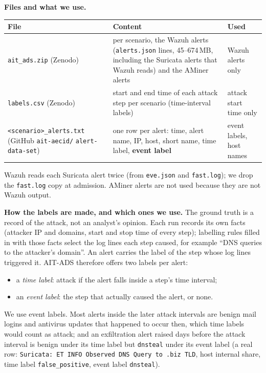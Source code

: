 \documentclass[10.5pt,a4paper]{article}
\newcommand{\sub}[1]{\par\smallskip\noindent\textbf{#1}\quad}
\begin{document}
\sub{Files and what we use.}
\begin{center}\small
\begin{tabularx}{\linewidth}{@{}p{3.3cm} >{\raggedright\arraybackslash}X p{2.5cm}@{}}
\toprule
File & Content & Used \\
\midrule
\texttt{ait\_ads.zip} (Zenodo) & per scenario, the Wazuh alerts (\texttt{alerts.json} lines, 45--674\,MB, including the Suricata alerts that Wazuh reads) and the AMiner alerts & Wazuh alerts only \\
\texttt{labels.csv} (Zenodo) & start and end time of each attack step per scenario (time-interval labels) & attack start time only \\
\texttt{<scenario>\_}\allowbreak\texttt{alerts.txt} (GitHub \texttt{ait-aecid/} \texttt{alert-data-set}) & one row per alert: time, alert name, IP, host, short name, time label, \textbf{event label} & event labels, host names \\
\bottomrule
\end{tabularx}
\end{center}
Wazuh reads each Suricata alert twice (from \texttt{eve.json} and \texttt{fast.log}); we drop the \texttt{fast.log} copy at admission. AMiner alerts are not used because they are not Wazuh output.

\sub{How the labels are made, and which ones we use.} The ground truth is a record of the attack, not an analyst's opinion. Each run records its own facts (attacker IP and domains, start and stop time of every step); labelling rules filled in with those facts select the log lines each step caused, for example ``DNS queries to the attacker's domain''. An alert carries the label of the step whose log lines triggered it. AIT-ADS therefore offers two labels per alert:
\begin{itemize}
\item a \emph{time label}: attack if the alert falls inside a step's time interval;
\item an \emph{event label}: the step that actually caused the alert, or none.
\end{itemize}
We use event labels. Most alerts inside the later attack intervals are benign mail logins and antivirus updates that happened to occur then, which time labels would count as attack; and an exfiltration alert raised days before the attack interval is benign under its time label but \texttt{dnsteal} under its event label (a real row: \texttt{Suricata: ET INFO Observed DNS Query to .biz TLD}, host internal share, time label \texttt{false\_positive}, event label \texttt{dnsteal}).
\end{document}
